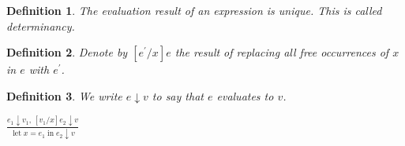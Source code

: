 \documentclass[10pt]{article}
\newcommand{\da}{\downarrow}
\DeclareMathOperator{\letexp}{let}
\DeclareMathOperator{\inexp}{in}
\newtheorem{definition}{Definition}
\begin{document}
\begin{multicols}{2}
\begin{definition}
    The evaluation result of an expression is unique. This is called
    \emph{determinancy}.
\end{definition}

\begin{definition}
    Denote by $[e^\prime / x]e$ the result of replacing all free occurrences of
    $x$ in $e$ with $e^\prime$.
\end{definition}

\begin{definition}
    We write $e \da v$ to say that $e$ evaluates to $v$.
\end{definition}

$
    \frac{e_1 \da v_1,\, [v_1/x]e_2 \da v}
    {\letexp {x = e_1} \inexp {e_2} \da v}
$

\end{multicols}
\end{document}
